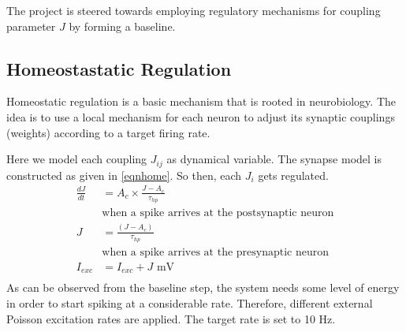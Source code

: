 \documentclass[a4paper,12pt]{article}
\begin{document}
The project is steered towards employing regulatory mechanisms for coupling parameter $J$ by forming a baseline.


\subsection{Homeostastatic Regulation}
Homeostatic regulation is a basic mechanism that is rooted in neurobiology. The idea is to use a local mechanism for each neuron to adjust its synaptic couplings (weights) according to a target firing rate. 

Here we model each coupling $J_{ij}$ as dynamical variable. The synapse model is constructed as given in \ref{eqnhome}. So then, each $J_i$ gets regulated.  
\begin{equation}
    \begin{split}
        \frac{dJ}{dt} &= A_c \times \frac{J-A_c}{\tau_{hp}} \\
        &\text{when a spike arrives at the postsynaptic neuron} \\
        J &= \frac{(J-A_c)}{\tau_{hp}} \\
        &\text{when a spike arrives at the presynaptic neuron}\\
        I_{exc} &= I_{exc} + J \text{  mV} \\
    \end{split}
    \label{eqnhome}
\end{equation}
As can be observed from the baseline step, the system needs some level of energy in order to start spiking at a considerable rate. Therefore, different external Poisson excitation rates are applied. The target rate is set to 10 Hz.
\end{document}
